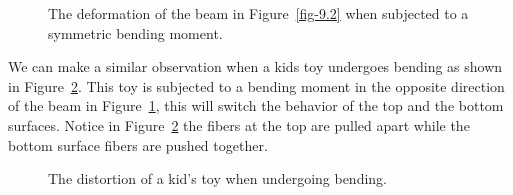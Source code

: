 \documentclass[
  letterpaper,
  DIV=11,
  numbers=noendperiod]{scrreprt}
\theoremstyle{definition}
\theoremstyle{remark}
\begin{document}
\begin{figure}


\caption{\label{fig-9.3}The deformation of the beam in
Figure~\ref{fig-9.2} when subjected to a symmetric bending moment.}

\end{figure}%

We can make a similar observation when a kids toy undergoes bending as
shown in Figure~\ref{fig-9.4}. This toy is subjected to a bending moment
in the opposite direction of the beam in Figure~\ref{fig-9.3}, this will
switch the behavior of the top and the bottom surfaces. Notice in
Figure~\ref{fig-9.4} the fibers at the top are pulled apart while the
bottom surface fibers are pushed together.

\begin{figure}


\caption{\label{fig-9.4}The distortion of a kid's toy when undergoing
bending.}

\end{figure}%
\end{document}
